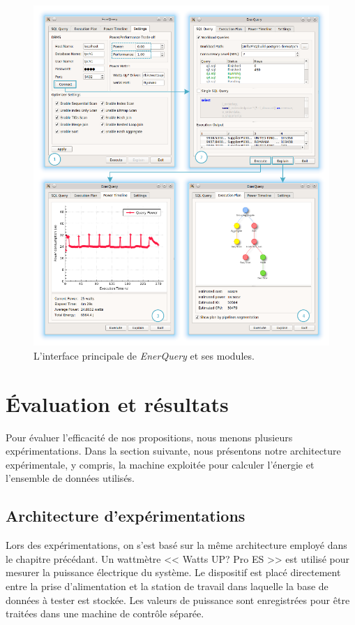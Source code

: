 \begin{figure}
	\centering
	\includegraphics[scale=1.15]{chapitre5/chap5Fig/components.pdf}
	\caption{L'interface principale de \textit{EnerQuery} et ses modules.}
	\label{fig:components}
\end{figure}

\section{Évaluation et résultats}\label{sec:ExperimentsPostgres}
Pour évaluer l'efficacité de nos propositions, nous menons plusieurs expérimentations. Dans la section suivante, nous présentons notre architecture  expérimentale, y compris, la machine exploitée pour calculer l'énergie et l'ensemble de données utilisés.

\subsection{Architecture d'expérimentations}\label{subsec:ExperimentSetupPostgres}
Lors des expérimentations, on s'est basé sur la même architecture employé dans le chapitre précédant. Un wattmètre << Watts UP? Pro ES >> est utilisé pour mesurer la puissance électrique du système. Le dispositif est placé directement entre la prise d'alimentation et la station de travail dans laquelle la base de données à tester est stockée. Les valeurs de puissance sont enregistrées pour être traitées dans une machine de contrôle séparée.

